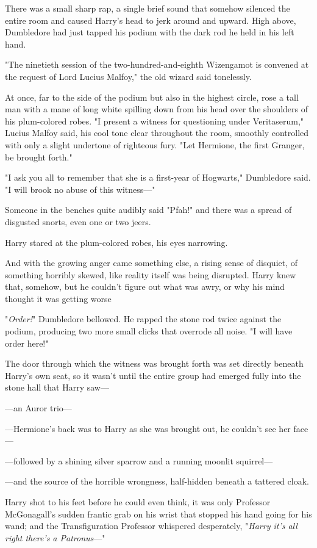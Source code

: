 There was a small sharp rap, a single brief sound that somehow silenced the
entire room and caused Harry's head to jerk around and upward. High above,
Dumbledore had just tapped his podium with the dark rod he held in his left
hand.

"The ninetieth session of the two-hundred-and-eighth Wizengamot is convened at
the request of Lord Lucius Malfoy," the old wizard said tonelessly.

At once, far to the side of the podium but also in the highest circle, rose a
tall man with a mane of long white spilling down from his head over the
shoulders of his plum-colored robes. "I present a witness for questioning under
Veritaserum," Lucius Malfoy said, his cool tone clear throughout the room,
smoothly controlled with only a slight undertone of righteous fury. "Let
Hermione, the first Granger, be brought forth."

"I ask you all to remember that she is a first-year of Hogwarts," Dumbledore
said. "I will brook no abuse of this witness\mbox{---}"

Someone in the benches quite audibly said "Pfah!" and there was a spread of
disgusted snorts, even one or two jeers.

Harry stared at the plum-colored robes, his eyes narrowing.

And with the growing anger came something else, a rising sense of disquiet, of
something horribly skewed, like reality itself was being disrupted. Harry knew
that, somehow, but he couldn't figure out what was awry, or why his mind
thought it was getting worse{\el}

"\emph{Order!}" Dumbledore bellowed. He rapped the stone rod twice against the
podium, producing two more small clicks that overrode all noise. "I will have
order here!"

The door through which the witness was brought forth was set directly beneath
Harry's own seat, so it wasn't until the entire group had emerged fully into
the stone hall that Harry saw---

---an Auror trio---

---Hermione's back was to Harry as she was brought out, he couldn't see her
face---

---followed by a shining silver sparrow and a running moonlit squirrel---

---and the source of the horrible wrongness, half-hidden beneath a tattered
cloak.

Harry shot to his feet before he could even think, it was only Professor
McGonagall's sudden frantic grab on his wrist that stopped his hand going for
his wand; and the Transfiguration Professor whispered desperately, "\emph{Harry
it's all right there's a Patronus}\mbox{---}"


